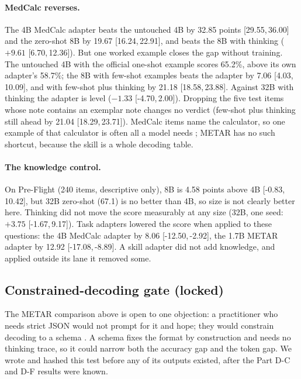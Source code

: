 \documentclass[11pt]{article}
\newcommand{\ci}[2]{[#1,\allowbreak\,#2]}
\begin{document}
\paragraph{MedCalc reverses.} The 4B MedCalc adapter beats the untouched 4B by 32.85 points \ci{29.55}{36.00} and the
zero-shot 8B by 19.67 \ci{16.24}{22.91}, and beats the 8B with thinking ($+9.61$ \ci{6.70}{12.36}). But one worked
example closes the gap without training. The untouched 4B with the official one-shot example scores 65.2\%, above
its own adapter's 58.7\%; the 8B with few-shot examples beats the adapter by 7.06 \ci{4.03}{10.09}, and with few-shot
plus thinking by 21.18 \ci{18.58}{23.88}. Against 32B with thinking the adapter is level ($-1.33$ \ci{-4.70}{2.00}).
Dropping the five test items whose note contains an exemplar note changes no verdict (few-shot plus thinking
still ahead by 21.04 \ci{18.29}{23.71}). MedCalc items name the calculator, so one example of that calculator is
often all a model needs \citep{min2022demonstrations}; METAR has no such shortcut, because the skill is a whole
decoding table.

\paragraph{The knowledge control.} On Pre-Flight (240 items, descriptive only), 8B is 4.58 points above 4B
\ci{-0.83}{10.42}, but 32B zero-shot (67.1) is no better than 4B, so size is not clearly better here. Thinking did not
move the score measurably at any size (32B, one seed: $+3.75$ \ci{-1.67}{9.17}). Task adapters lowered the score when
applied to these questions: the 4B MedCalc adapter by 8.06 \ci{-12.50}{-2.92}, the 1.7B METAR adapter by 12.92
\ci{-17.08}{-8.89}. A skill adapter did not add knowledge, and applied outside its lane it removed some.

\subsection{Constrained-decoding gate (locked)}
\label{sec:gate}
The METAR comparison above is open to one objection: a practitioner who needs strict JSON would not prompt for it and
hope; they would constrain decoding to a schema \citep{willard2023outlines,dong2025xgrammar}. A schema fixes the
format by construction and needs no thinking trace, so it could narrow both the accuracy gap and the token gap. We
wrote and hashed this test before any of its outputs existed, after the Part D-C and D-F results were known.
\end{document}
